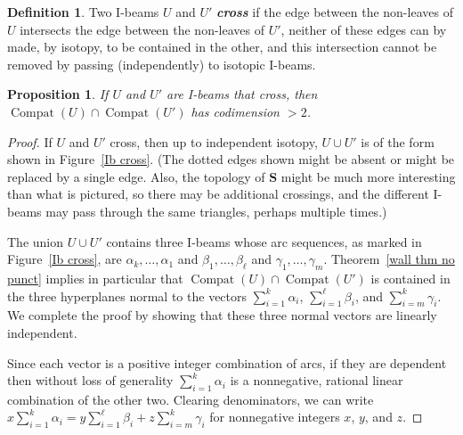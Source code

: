 \documentclass{amsart}
\newtheorem{prop}[proposition]{Proposition}
\theoremstyle{definition}
\newtheorem{definition}[proposition]{Definition}
\theoremstyle{remark}
\numberwithin{equation}{section}
\newcommand{\newword}[1]{\textbf{\emph{#1}}}
\newcommand{\0}{{\mathbf{0}}}
\renewcommand{\S}{\mathbf{S}}
\newcommand{\Compat}{\operatorname{Compat}}
\begin{document}
\begin{definition}\label{Ibeam cross def}
Two I-beams $U$ and $U'$ \newword{cross} if the edge between the non-leaves of $U$ intersects the edge between the non-leaves of $U'$, neither of these edges can by made, by isotopy, to be contained in the other, and this intersection cannot be removed by passing (independently) to isotopic I-beams.
\end{definition}


\begin{prop}\label{crossing Ibeams}
If $U$ and $U'$ are I-beams that cross, then $\Compat(U)\cap\Compat(U')$ has codimension $>2$.
\end{prop}
\begin{proof}
If $U$ and $U'$ cross, then up to independent isotopy, $U\cup U'$ is of the form shown in Figure~\ref{Ib cross}.
(The dotted edges shown might be absent or might be replaced by a single edge.
Also, the topology of $\S$ might be much more interesting than what is pictured, so there may be additional crossings, and the different I-beams may pass through the same triangles, perhaps multiple times.)

The union $U\cup U'$ contains three I-beams whose arc sequences, as marked in Figure~\ref{Ib cross}, are $\alpha_k,\ldots,\alpha_1$ and $\beta_1,\ldots,\beta_\ell$ and $\gamma_1,\ldots,\gamma_m$.
Theorem~\ref{wall thm no punct} implies in particular that $\Compat(U)\cap\Compat(U')$ is contained in the three hyperplanes normal to the vectors $\sum_{i=1}^k\alpha_i$, $\sum_{i=1}^\ell\beta_i$, and $\sum_{i=m}^k\gamma_i$.
We complete the proof by showing that these three normal vectors are linearly independent.

Since each vector is a positive integer combination of arcs, if they are dependent then without loss of generality $\sum_{i=1}^k\alpha_i$ is a nonnegative, rational linear combination of the other two.
Clearing denominators, we can write $x\sum_{i=1}^k\alpha_i=y\sum_{i=1}^\ell\beta_i+z\sum_{i=m}^k\gamma_i$ for nonnegative integers $x$, $y$, and $z$.






\end{proof}

\newpage

\quad

\newpage

\quad

\newpage
\end{document}
